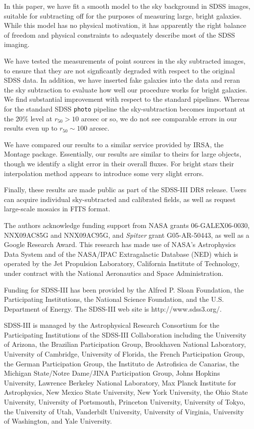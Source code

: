 \documentclass[10pt,preprint]{aastex}
\begin{document}
In this paper, we have fit a smooth model to the sky background in
SDSS images, suitable for subtracting off for the purposes of
measuring large, bright galaxies.  While this model has no physical
motivation, it has apparently the right balance of freedom and
physical constraints to adequately describe most of the SDSS imaging.

We have tested the measurements of point sources in the sky subtracted
images, to ensure that they are not signficantly degraded with respect
to the original SDSS data.  In addition, we have inserted fake
galaxies into the data and reran the sky subtraction to evaluate how
well our procedure works for bright galaxies.  We find substantial
improvement with respect to the standard pipelines.  Whereas for the
standard SDSS {\tt photo} pipeline the sky-subtraction becomes
important at the 20\% level at $r_{50}>10$ arcsec or so, we do not see
comparable errors in our results even up to $r_{50} \sim 100$ arcsec.

We have compared our results to a similar service provided by IRSA,
the Montage package. Essentially, our results are similar to theirs
for large objects, though we identify a slight error in their overall
fluxes. For bright stars their interpolation method appears to
introduce some very slight errors.

Finally, these results are made public as part of the SDSS-III DR8
release. Users can acquire individual sky-subtracted and calibrated
fields, as well as request large-scale mosaics in FITS format.

\acknowledgments

The authors acknowledge funding support from NASA grants
06-GALEX06-0030, NNX09AC85G and NNX09AC95G, and \emph{Spitzer} grant
G05-AR-50443, as well as a Google Research Award. This research has
made use of NASA's Astrophysics Data System and of the NASA/IPAC
Extragalactic Database (NED) which is operated by the Jet Propulsion
Laboratory, California Institute of Technology, under contract with
the National Aeronautics and Space Administration.

Funding for SDSS-III has been provided by the Alfred P. Sloan
Foundation, the Participating Institutions, the National Science
Foundation, and the U.S. Department of Energy. The SDSS-III web site
is http://www.sdss3.org/.

SDSS-III is managed by the Astrophysical Research Consortium for the
Participating Institutions of the SDSS-III Collaboration including the
University of Arizona, the Brazilian Participation Group, Brookhaven
National Laboratory, University of Cambridge, University of Florida,
the French Participation Group, the German Participation Group, the
Instituto de Astrofisica de Canarias, the Michigan State/Notre
Dame/JINA Participation Group, Johns Hopkins University, Lawrence
Berkeley National Laboratory, Max Planck Institute for Astrophysics,
New Mexico State University, New York University, the Ohio State
University, University of Portsmouth, Princeton University, University
of Tokyo, the University of Utah, Vanderbilt University, University of
Virginia, University of Washington, and Yale University.
\end{document}
